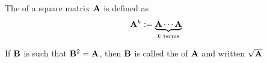\begin{frame}

    \vspace{2em}
    The  of a square matrix $\mathbf A$ is defined as
    \begin{equation*}
        \mathbf A^k := \underbrace{\mathbf A \cdots \mathbf A}_{k \text{ terms}} 
    \end{equation*}
    
    \vspace{.7em}
    If $\mathbf B$ is such that $\mathbf B^2 = \mathbf A$, then $\mathbf B$
    is called the  of $\mathbf A$ and written $\sqrt{\mathbf A}$
    
\end{frame}

\begin{frame}


\end{frame}
